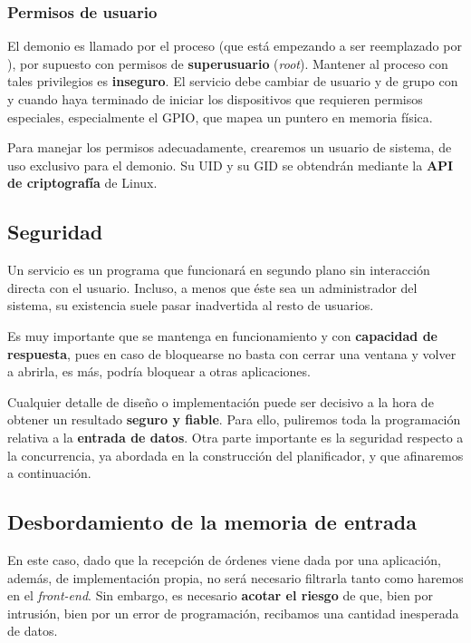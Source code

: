 \subsubsection{Permisos de usuario}

El demonio es llamado por el proceso  (que está empezando a ser reemplazado por ), por supuesto con permisos de \textbf{superusuario} (\textit{root}). Mantener al proceso con tales privilegios es \textbf{inseguro}. El servicio debe cambiar de usuario y de grupo con  y  cuando haya terminado de iniciar los dispositivos que requieren permisos especiales, especialmente el \acrshort{GPIO}, que mapea un puntero en memoria física.

Para manejar los permisos adecuadamente, crearemos un usuario de sistema, de uso exclusivo para el demonio. Su \acrshort{UID} y su \acrshort{GID} se obtendrán mediante la \textbf{\acrshort{API} de criptografía} de Linux.

\subsection{Seguridad}
\label{subsec:seg_demonio}

Un servicio es un programa que funcionará en segundo plano sin interacción directa con el usuario. Incluso, a menos que éste sea un administrador del sistema, su existencia suele pasar inadvertida al resto de usuarios.

Es muy importante que se mantenga en funcionamiento y con \textbf{capacidad de respuesta}, pues en caso de bloquearse no basta con cerrar una ventana y volver a abrirla, es más, podría bloquear a otras aplicaciones.

Cualquier detalle de diseño o implementación puede ser decisivo a la hora de obtener un resultado \textbf{seguro y fiable}. Para ello, puliremos toda la programación relativa a la \textbf{entrada de datos}. Otra parte importante es la seguridad respecto a la concurrencia, ya abordada en la construcción del planificador, y que afinaremos a continuación.

\subsection{Desbordamiento de la memoria de entrada}

En este caso, dado que la recepción de órdenes viene dada por una aplicación, además, de implementación propia, no será necesario filtrarla tanto como haremos en el \textit{front-end}. Sin embargo, es necesario \textbf{acotar el riesgo} de que, bien por intrusión, bien por un error de programación, recibamos una cantidad inesperada de datos.

